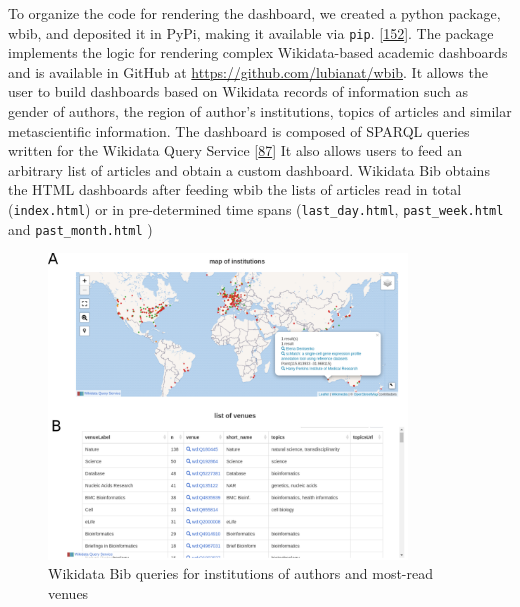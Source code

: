 To organize the code for rendering the dashboard, we created a python package, wbib, and deposited it in PyPi, making it available via \texttt{pip}. {[}\protect\hyperlink{ref-6chnW6cc}{152}{]}.
The package implements the logic for rendering complex Wikidata-based academic dashboards and is available in GitHub at \url{https://github.com/lubianat/wbib}.
It allows the user to build dashboards based on Wikidata records of information such as gender of authors, the region of author's institutions, topics of articles and similar metascientific information.
The dashboard is composed of SPARQL queries written for the Wikidata Query Service {[}\protect\hyperlink{ref-2wDsXBwd}{87}{]}
It also allows users to feed an arbitrary list of articles and obtain a custom dashboard.
Wikidata Bib obtains the HTML dashboards after feeding wbib the lists of articles read in total (\texttt{index.html}) or in pre-determined time spans (\texttt{last\_day.html}, \texttt{past\_week.html} and \texttt{past\_month.html} )

\begin{figure}
\hypertarget{fig:dashboard}{%
\centering
\includegraphics[width=0.85\textwidth,height=\textheight]{images/wikidata_bib_display.png}
\caption{Wikidata Bib queries for institutions of authors and most-read venues}\label{fig:dashboard}
}
\end{figure}


